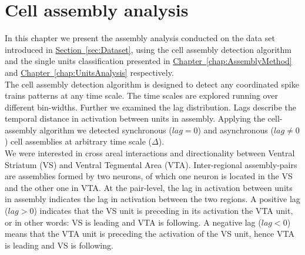 \chapter{Cell assembly analysis}
\label{chap:AssemblyAnalysis}
In this chapter we present the assembly analysis conducted on the data set introduced in \hyperref[sec:Dataset]{Section~\ref*{sec:Dataset}}, using the cell assembly detection algorithm and the single units classification presented in \hyperref[chap:AssemblyMethod]{Chapter~\ref*{chap:AssemblyMethod}} and \hyperref[chap:UnitsAnalysis]{Chapter~\ref*{chap:UnitsAnalysis}} respectively.\\
The cell assembly detection algorithm is designed to detect any coordinated spike trains patterns at any time scale. The time scales are explored running over different bin-widths. Further we examined the lag distribution. Lags describe the temporal distance in activation between units in assembly. Applying the cell-assembly algorithm we detected synchronous ($lag=0$) and asynchronous ($lag\neq0$) cell assemblies at arbitrary time scale ($\Delta$).\\
We were interested in cross areal interactions and directionality between Ventral Striatum (VS) and Ventral Tegmental Area (VTA). Inter-regional assembly-pairs are assemblies formed by two neurons, of which one neuron is located in  the VS and the other one in VTA. At the pair-level, the lag in activation between units in assembly indicates the lag in activation between the two regions. A positive lag ($lag>0$) indicates that the VS unit is preceding in its activation the VTA unit, or in other words: VS is leading and VTA is following. A negative lag ($lag<0$) means that the VTA unit is preceding the activation of the VS unit, hence VTA is leading and VS is following.
